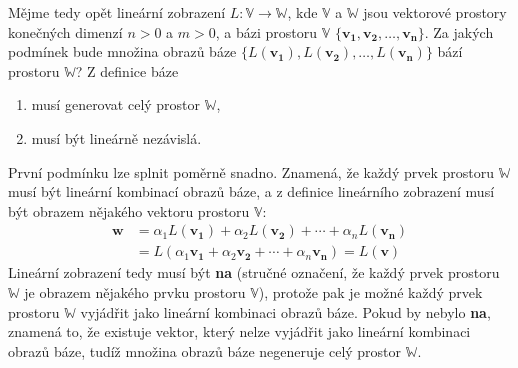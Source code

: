 \documentclass[a5paper,12pt]{amsbook}
\theoremstyle{definition}
\newcommand{\myscalar}[1]{#1}
\newcommand{\myvec}[1]{\mathbf{#1}}
\newcommand{\myspace}[1]{\mathbb{#1}}
\newcommand{\mymap}[1]{#1}
\begin{document}
Mějme tedy opět lineární zobrazení $\mymap{L}: \myspace{V}\rightarrow\myspace{W}$, kde $\myspace{V}$
a $\myspace{W}$ jsou vektorové prostory konečných dimenzí $n > 0$ a $m > 0$, a bázi prostoru $\myspace{V}$
$\{\myvec{v_1}, \myvec{v_2}, \ldots, \myvec{v_n}\}$. Za jakých podmínek bude množina obrazů báze
$\{\mymap{L}(\myvec{v_1}), \mymap{L}(\myvec{v_2}), \ldots, \mymap{L}(\myvec{v_n})\}$ bází prostoru
$\myspace{W}$? Z definice báze
\begin{enumerate}
  \item musí generovat celý prostor $\myspace{W}$,
  \item musí být lineárně nezávislá.
\end{enumerate}
První podmínku lze splnit poměrně snadno. Znamená, že každý prvek prostoru $\myspace{W}$ musí být
lineární kombinací obrazů báze, a z definice lineárního zobrazení musí být obrazem nějakého
vektoru prostoru $\myspace{V}$:
\begin{equation*}
\begin{split}
\myvec{w}
  &= \myscalar{\alpha{}_1}\mymap{L}(\myvec{v_1}) + \myscalar{\alpha{}_2}\mymap{L}(\myvec{v_2})
      + \cdots + \myscalar{\alpha{}_n}\mymap{L}(\myvec{v_n}) \\
  &= \mymap{L}(\myscalar{\alpha{}_1}\myvec{v_1} + \myscalar{\alpha{}_2}\myvec{v_2} + \cdots 
      + \myscalar{\alpha{}_n}\myvec{v_n}) = \mymap{L}(\myvec{v})
\end{split}
\end{equation*}
Lineární zobrazení tedy musí být \textbf{na} (stručné označení, že každý prvek prostoru 
$\myspace{W}$ je obrazem nějakého prvku prostoru $\myspace{V}$), protože pak je možné
každý prvek prostoru $\myspace{W}$ vyjádřit jako lineární kombinaci obrazů báze. Pokud
by nebylo \textbf{na}, znamená to, že existuje vektor, který nelze vyjádřit jako lineární
kombinaci obrazů báze, tudíž množina obrazů báze negeneruje celý prostor $\myspace{W}$.
\end{document}
